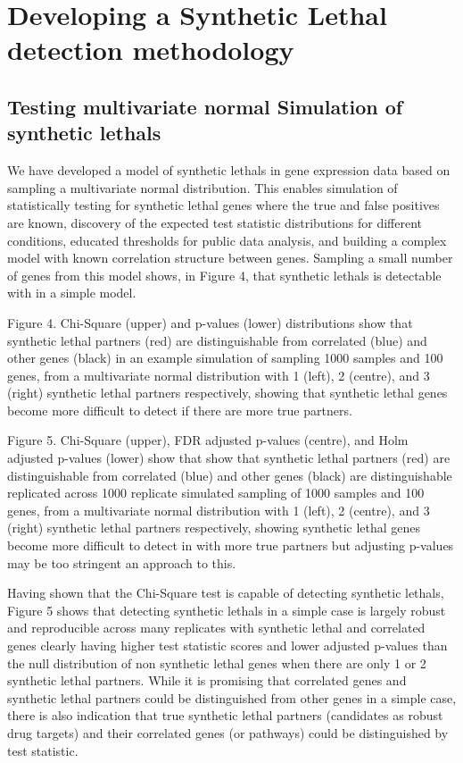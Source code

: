 \iffalse
\section{Developing a Synthetic Lethal detection methodology}

\subsection{Testing multivariate normal Simulation of \Glspl{synthetic lethal}}

We have developed a model of \glspl{synthetic lethal} in \gls{gene expression} data based on sampling a multivariate normal distribution.  This enables simulation of statistically testing for \gls{synthetic lethal} genes where the true and false positives are known, discovery of the expected test statistic distributions for different conditions, educated thresholds for public data analysis, and building a complex model with known correlation structure between genes.  Sampling a small number of genes from this model shows, in Figure 4, that \glspl{synthetic lethal} is detectable with in a simple model.

Figure 4.  Chi-Square (upper) and p-values (lower) distributions show that \gls{synthetic lethal} partners (red) are distinguishable from correlated (blue) and other genes (black) in an example simulation of sampling 1000 samples and 100 genes, from a multivariate normal distribution with 1 (left), 2 (centre), and 3 (right) \gls{synthetic lethal} partners respectively, showing that \gls{synthetic lethal} genes become more difficult to detect if there are more true partners.

Figure 5.  Chi-Square (upper), \gls{FDR} adjusted p-values (centre), and Holm adjusted p-values (lower) show that show that \gls{synthetic lethal} partners (red) are distinguishable from correlated (blue) and other genes (black) are distinguishable replicated across 1000 replicate simulated sampling of 1000 samples and 100 genes, from a multivariate normal distribution with 1 (left), 2 (centre), and 3 (right) \gls{synthetic lethal} partners respectively, showing \gls{synthetic lethal} genes become more difficult to detect in with more true partners but adjusting p-values may be too stringent an approach to this.

Having shown that the Chi-Square test is capable of detecting \glspl{synthetic lethal}, Figure 5 shows that detecting \glspl{synthetic lethal} in a simple case is largely robust and reproducible across many replicates with \gls{synthetic lethal} and correlated genes clearly having higher test statistic scores and lower adjusted p-values than the null distribution of non synthetic lethal genes when there are only 1 or 2 \gls{synthetic lethal} partners.  While it is promising that correlated genes and \gls{synthetic lethal} partners could be distinguished from other genes in a simple case, there is also indication that true \gls{synthetic lethal} partners (candidates as robust drug targets) and their correlated genes (or pathways) could be distinguished by test statistic.

